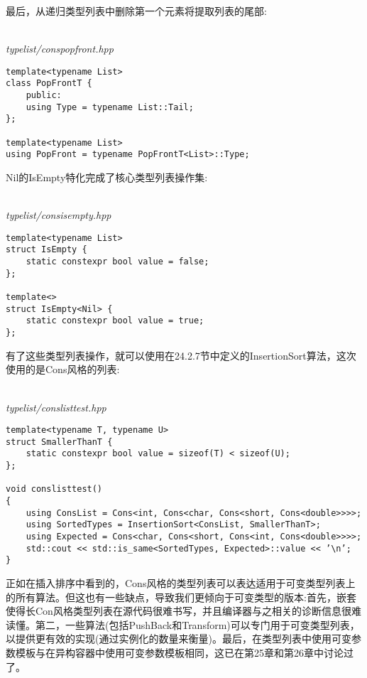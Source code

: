 最后，从递归类型列表中删除第一个元素将提取列表的尾部:

\hspace*{\fill} \\ %
\noindent
\textit{typelist/conspopfront.hpp}
\begin{lstlisting}[style=styleCXX]
template<typename List>
class PopFrontT {
	public:
	using Type = typename List::Tail;
};

template<typename List>
using PopFront = typename PopFrontT<List>::Type;
\end{lstlisting}

Nil的IsEmpty特化完成了核心类型列表操作集:

\hspace*{\fill} \\ %
\noindent
\textit{typelist/consisempty.hpp}
\begin{lstlisting}[style=styleCXX]
template<typename List>
struct IsEmpty {
	static constexpr bool value = false;
};

template<>
struct IsEmpty<Nil> {
	static constexpr bool value = true;
};
\end{lstlisting}

有了这些类型列表操作，就可以使用在24.2.7节中定义的InsertionSort算法，这次使用的是Cons风格的列表:

\hspace*{\fill} \\ %
\noindent
\textit{typelist/conslisttest.hpp}
\begin{lstlisting}[style=styleCXX]
template<typename T, typename U>
struct SmallerThanT {
	static constexpr bool value = sizeof(T) < sizeof(U);
};

void conslisttest()
{
	using ConsList = Cons<int, Cons<char, Cons<short, Cons<double>>>>;
	using SortedTypes = InsertionSort<ConsList, SmallerThanT>;
	using Expected = Cons<char, Cons<short, Cons<int, Cons<double>>>>;
	std::cout << std::is_same<SortedTypes, Expected>::value << ’\n’;
}
\end{lstlisting}

正如在插入排序中看到的，Cons风格的类型列表可以表达适用于可变类型列表上的所有算法。但这也有一些缺点，导致我们更倾向于可变类型的版本:首先，嵌套使得长Con风格类型列表在源代码很难书写，并且编译器与之相关的诊断信息很难读懂。第二，一些算法(包括PushBack和Transform)可以专门用于可变类型列表，以提供更有效的实现(通过实例化的数量来衡量)。最后，在类型列表中使用可变参数模板与在异构容器中使用可变参数模板相同，这已在第25章和第26章中讨论过了。





















